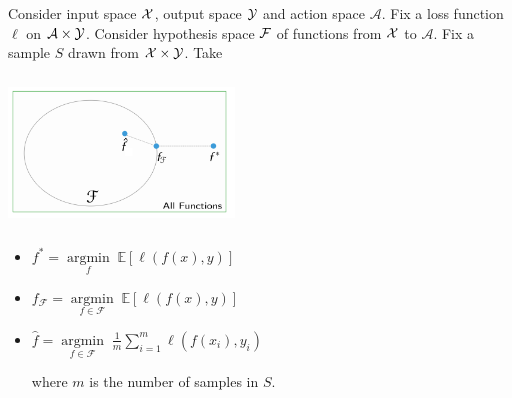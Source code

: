 \documentclass[addpoints,12pt,answers]{exam}
\begin{document}
\begin{questions}

 Consider input space $\mathcal{X}$, output space $\mathcal{Y}$ and action space $\mathcal{A}$. Fix a loss function $\ell$ on $\mathcal{A} \times \mathcal{Y}$. Consider hypothesis space $\mathcal{F}$ of functions from $\mathcal{X}$ to $\mathcal{A}$. Fix a sample $S$ drawn from $\mathcal{X} \times \mathcal{Y}$. Take
  \vspace{-0.2in}
  \begin{flushright}
      \includegraphics[width=6cm,height=4cm]{risk_decomp.PNG}
    \end{flushright}

\vspace{-1.6in}    
  \begin{itemize}
      \item $f^* = \underset{f}{\operatorname{argmin}} \; \mathbb{E}\left[\ell(f(x),y)\right]$
    \item $f_{\mathcal{F}} = \underset{f \in \mathcal{F}}{\operatorname{argmin}} \; \mathbb{E}\left[\ell(f(x),y)\right]$
    \item $\hat{f} = \underset{f \in \mathcal{F}}{\operatorname{argmin}} \; \frac{1}{m} \sum_{i=1}^{m} \ell(f(x_i), y_i)$ \newline 
    \vspace{0.1cm}
    
    {\hspace{-0.9cm} where $m$ is the number of samples in $S$.}
  \end{itemize}

\vspace{0.2in}  

\end{questions}
\end{document}
